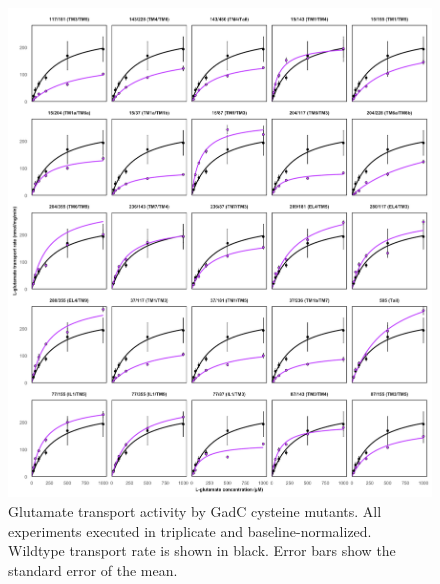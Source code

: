 \begin{figure}[h]
\centering
\includegraphics[width=5.5in]{Figures/gadc_supp_transport45.pdf}
\caption[Glutamate transport activity by GadC cysteine mutants.]{Glutamate transport activity by GadC cysteine mutants. All experiments executed in triplicate and baseline-normalized. Wildtype transport rate is shown in black. Error bars show the standard error of the mean.}
\label{fig:gadc_supp_transport}
\end{figure}

